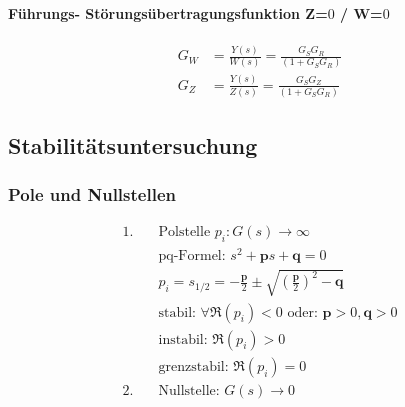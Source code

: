 \documentclass{article}
\begin{document}
\begin{landscape}
\begin{multicols}{2}
\begin{multicols}{2}
\begin{multicols}{2}
\paragraph{Führungs- Störungsübertragungsfunktion Z=$0$ / W=$0$}
	\begin{align*}
		G_W &= \frac{Y(s)}{W(s)} = \frac{G_SG_R}{(1+G_SG_R)} \\
		G_{Z} &=\frac{Y(s)}{Z(s)} =\frac{G_{S}G_Z}{\left(1+G_{S} G_{R}\right)}
\end{align*}

\subsection*{Stabilitätsuntersuchung}

\subsubsection*{Pole und Nullstellen}
	\begin{align*}
		1. &\quad  \text{Polstelle } p_i: G(s) \rightarrow \infty \\
		& \quad\text{pq-Formel: } s^2 + \mathbf{p}s + \mathbf{q} = 0 \\
		&\quad p_i = s_{1/2} = -\frac{\mathbf{p}}{2} \pm \sqrt{\left(\frac{\mathbf{p}}{2}\right)^2-\mathbf{q}}\\
		 &\quad \text{stabil: } \forall \Re(p_i) < 0 \text{ oder: } \mathbf{p}>0, \mathbf{q}>0   \\
		 &\quad \text{instabil: } \Re(p_i) > 0 \\
		 &\quad \text{grenzstabil: } \Re(p_i) = 0\\
		2. &\quad \text{Nullstelle: } G(s) \rightarrow 0 \\
	\end{align*}



\end{multicols}
\end{multicols}
\end{multicols}
\end{landscape}
\end{document}
